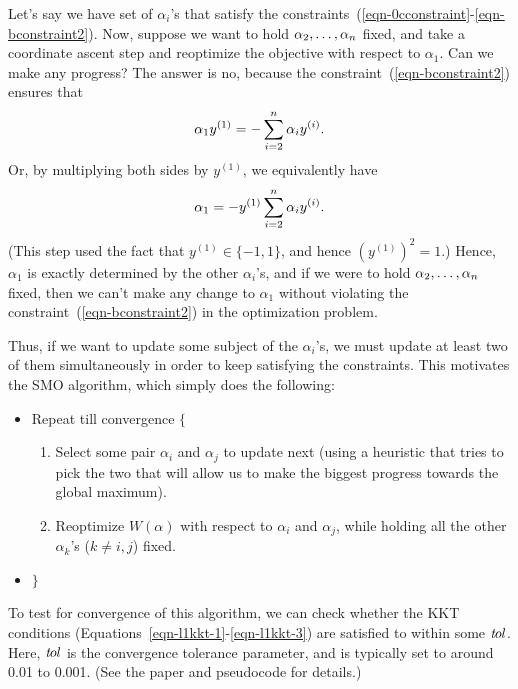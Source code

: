 \documentclass{article}
\begin{document}
Let's say we have set of $\alpha_i$'s that satisfy the
constraints~(\ref{eqn-0cconstraint}-\ref{eqn-bconstraint2}).  Now, suppose we want to
hold $\alpha_2, \ldots, \alpha_{{n}}$ fixed, and take a coordinate ascent step and reoptimize
the objective with respect to $\alpha_1$.  Can we make any progress?  The answer is no, because the
constraint~(\ref{eqn-bconstraint2}) ensures that
\[
\alpha_1 y^{(1)} = -\sum_{i=2}^{n} \alpha_i {y^{(i)}}.
\]
Or, by multiplying both sides by $y^{(1)}$, we equivalently have
\[
\alpha_1 = - y^{(1)} \sum_{i=2}^{n} \alpha_i {y^{(i)}}.
\]
(This step used the fact that $y^{(1)} \in \{-1, 1\}$, and hence $(y^{(1)})^2 = 1$.)  Hence,
$\alpha_1$ is exactly determined by the other $\alpha_i$'s, and if we were to
hold $\alpha_2,\ldots, \alpha_{{n}}$ fixed, then we can't make any change to $\alpha_1$ without
violating the constraint~(\ref{eqn-bconstraint2}) in the optimization problem.

Thus, if we want to update some subject of the $\alpha_i$'s, we must update at least
two of them simultaneously in order to keep satisfying the constraints.  This motivates
the SMO algorithm, which simply does the following:

\begin{itemize}
\item[] Repeat till convergence $\{$
  \begin{enumerate}
  \item Select some pair $\alpha_i$ and $\alpha_j$ to update next (using a heuristic that tries
         to pick the two that will allow us to make the biggest progress towards the global maximum).
  \item Reoptimize $W(\alpha)$ with respect to  $\alpha_i$ and $\alpha_j$, while holding all
the other $\alpha_k$'s ($k\neq i,j$) fixed.
  \end{enumerate}
\item[] $\}$
\end{itemize}

To test for convergence of this algorithm, we can check whether the KKT conditions
(Equations~\ref{eqn-l1kkt-1}-\ref{eqn-l1kkt-3}) are satisfied to within some ${\textit tol}$.
Here, ${\textit tol}$ is the convergence tolerance parameter, and is typically set to
around 0.01 to 0.001.  (See the paper and pseudocode for details.)

\end{document}
